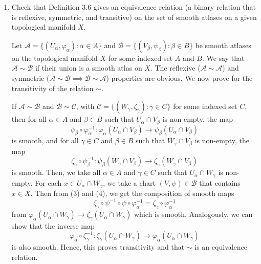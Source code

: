 \documentclass[12pt]{article}
\begin{document}
\begin{enumerate}
\item Check that Definition 3.6 gives an
    equivalence relation (a binary relation
    that is reflexive, symmetric,
    and transitive) on the set of smooth
    atlases on a given topological manifold
    $X$.
 
\begin{mybox}

    Let $\mathcal{A}=\{(U_\alpha,\varphi_\alpha):
    \alpha\in A\}$ and 
    $\mathcal{B}=\{(V_\beta,\psi_\beta):
    \beta\in B\}$ be smooth atlases on the
    topological manifold $X$ for some indexed
    set $A$ and $B$. We say that $\mathcal{A}
    \sim\mathcal{B}$ if their union is a smooth
    atlas on $X$. The reflexive ($\mathcal{A}
    \sim\mathcal{A}$) and symmetric
    ($\mathcal{A}
    \sim\mathcal{B}\implies\mathcal{B}
    \sim\mathcal{A}$) properties are obvious.
    We now prove for the transitivity of the
    relation $\sim$.

    \vspace*{3mm}
    If $\mathcal{A}\sim\mathcal{B}$ and $\mathcal{B}
    \sim\mathcal{C}$, with
    $\mathcal{C}=\{(W_\gamma,\zeta_\gamma):
    \gamma\in C\}$ for some indexed set $C$, then
    for all $\alpha\in A$ and $\beta
        \in B$ such that $U_\alpha\cap V_\beta$
        is non-empty, the map
        \begin{equation}
            \psi_\beta\circ\varphi_\alpha^{-1}:
            \varphi_\alpha(U_\alpha\cap V_\beta)
            \to \psi_\beta(
                U_\alpha\cap V_\beta
            )
        \end{equation} is smooth, and
        for all $\gamma\in C$ and $\beta
        \in B$ such that $W_\gamma\cap V_\beta$
        is non-empty, the map
        \begin{equation}
            \zeta_\gamma\circ\psi_\beta^{-1}:
            \psi_\beta(W_\gamma\cap V_\beta)
            \to \zeta_\gamma(
                W_\gamma\cap V_\beta
            )
        \end{equation} is smooth.
        Then, we take all $\alpha\in A$ and
        $\gamma\in C$ such that $U_\alpha\cap
        W_\gamma$ is non-empty.
        For each $x\in U_\alpha\cap
        W_\gamma$, we take a chart $(V,\psi)\in
        \mathcal{B}$ that contains $x\in X$.
        Then from (3) and (4), we get the composition
        of smooth maps
        $$\zeta_\gamma\circ\psi^{-1}
        \circ \psi\circ\varphi_\alpha^{-1}
        =\zeta_\gamma\circ\varphi_\alpha^{-1}$$
        from $\varphi_\alpha(U_\alpha\cap
        W_\gamma)\to \zeta_\gamma(U_\alpha\cap
        W_\gamma)$ which is smooth. Analogously,
        we can show that the inverse map
        $$\varphi_\alpha\circ\zeta_\gamma^{-1}:
        \zeta_\gamma(U_\alpha\cap
        W_\gamma)
        \to \varphi_\alpha(
            U_\alpha\cap W_\gamma
        )$$ is also smooth. Hence, this proves
        transitivity and that $\sim$ is an
        equivalence relation.


\end{mybox}
\end{enumerate}
\end{document}
